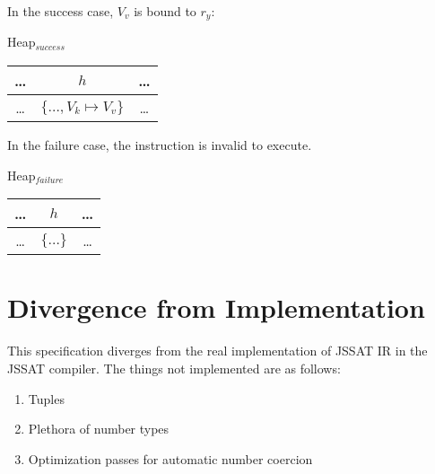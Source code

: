 \documentclass[twocolumn]{article}
\begin{document}
In the success case, $V_v$ is bound to $r_y$:

\begin{center}
  Heap$_{success}$ \\
  \begin{tabular}{ |c|c|c| }
    \hline
    \dots & $h$                            & \dots \\
    \hline
    \dots & $\{ \dots, V_k \mapsto V_v \}$ & \dots \\
    \hline
  \end{tabular}
\end{center}

In the failure case, the instruction is invalid to execute.

\begin{center}
  Heap$_{failure}$ \\
  \begin{tabular}{ |c|c|c| }
    \hline
    \dots & $h$           & \dots \\
    \hline
    \dots & $\{ \dots \}$ & \dots \\
    \hline
  \end{tabular}
\end{center}

\section{Divergence from Implementation}

This specification diverges from the real implementation of JSSAT IR in the JSSAT
compiler. The things not implemented are as follows:

\begin{enumerate}
  \item Tuples
  \item Plethora of number types
  \item Optimization passes for automatic number coercion
\end{enumerate}



\end{document}
